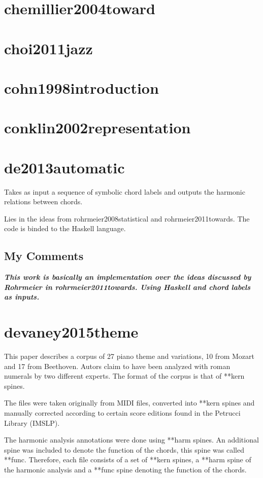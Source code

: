 \section{chemillier2004toward }
\section{choi2011jazz }
\section{cohn1998introduction }
\section{conklin2002representation }
\section{de2013automatic }
  Takes as input a sequence of symbolic chord labels and outputs the harmonic relations between chords.

  Lies in the ideas from rohrmeier2008statistical and rohrmeier2011towards. The code is binded to the Haskell language.

  \subsection{My Comments}
    \emph{\textbf{
      This work is basically an implementation over the ideas discussed by Rohrmeier in rohrmeier2011towards. Using Haskell and chord labels as inputs.
    }}
\section{devaney2015theme }
  This paper describes a corpus of 27 piano theme and variations, 10 from Mozart and 17 from Beethoven. Autors claim to have been analyzed with roman numerals by two different experts. The format of the corpus is that of **kern spines.

  The files were taken originally from MIDI files, converted into **kern spines and manually corrected according to certain score editions found in the Petrucci Library (IMSLP).

  The harmonic analysis annotations were done using  **harm spines. An additional spine was included to denote the function of the chords, this spine was called **func. Therefore, each file consists of a set of **kern spines, a **harm spine of the harmonic analysis and a **func spine denoting the function of the chords.

